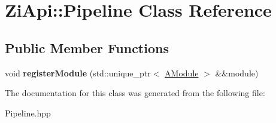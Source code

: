 \hypertarget{classZiApi_1_1Pipeline}{}\section{Zi\+Api\+::Pipeline Class Reference}
\label{classZiApi_1_1Pipeline}
\subsection*{Public Member Functions}
\begin{DoxyCompactItemize}
\item 
\mbox{\label{classZiApi_1_1Pipeline_a2f9bd5950e961d32786e2255a841a9c3}} 
void {\bfseries register\+Module} (std\+::unique\+\_\+ptr$<$ \mbox{\hyperlink{classZiApi_1_1AModule}{A\+Module}} $>$ \&\&module)
\end{DoxyCompactItemize}


The documentation for this class was generated from the following file\+:\begin{DoxyCompactItemize}
\item 
Pipeline.\+hpp\end{DoxyCompactItemize}
